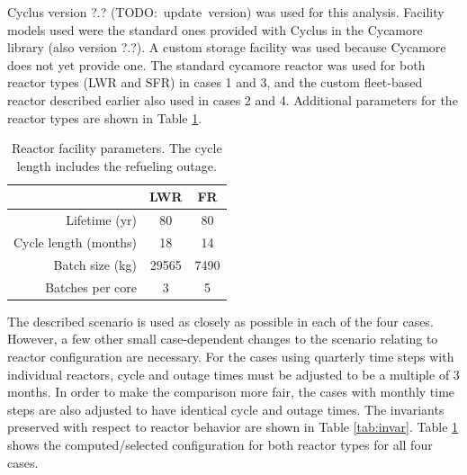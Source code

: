 \documentclass{style}
\begin{document}
Cyclus version ?.? (TODO:~update~version) was used for this analysis.
Facility models used were the standard ones provided with Cyclus in the
Cycamore library (also version ?.?).  A custom storage facility was used
because Cycamore does not yet provide one.  The standard cycamore reactor was
used for both reactor types (LWR and SFR) in cases 1 and 3, and the custom
fleet-based reactor described earlier also used in cases 2 and 4.
Additional parameters for the reactor types are shown in Table
\ref{tab:reactors}.

\vspace{2mm}

\begin{table}[h]
    \centering
    \begin{tabular}{ |r | c c | }
        \hline                       
            & LWR & FR \\
        \hline                       
        Lifetime (yr)         & 80 & 80 \\
        Cycle length (months) & 18 & 14 \\
        Batch size (kg)       & 29565 & 7490 \\
        Batches per core      & 3 & 5 \\
        \hline                       
    \end{tabular}
    \captionsetup{justification=centering}
    \caption[Reactor facility parameters]{Reactor facility parameters. The cycle length includes the refueling outage.}
    \label{tab:reactors}
\end{table}

The described scenario is used as closely as possible in each of the four
cases.  However, a few other small case-dependent changes to the scenario
relating to reactor configuration are necessary.  For the cases using
quarterly time steps with individual reactors, cycle and outage times must be
adjusted to be a multiple of 3 months.  In order to make the comparison more
fair, the cases with monthly time steps are also adjusted to have identical
cycle and outage times.  The invariants preserved with respect to reactor
behavior are shown in Table \ref{tab:invar}.  Table \ref{tab:reactors} shows
the computed/selected configuration for both reactor types for all four cases.
\end{document}
